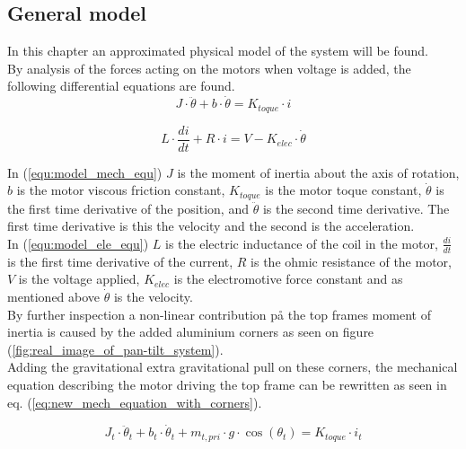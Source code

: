 \documentclass[../../main]{subfiles}
\begin{document}
\subsection{General model}
\label{sec:General_model}
In this chapter an approximated physical model of the system will be found.\\

By analysis of the forces acting on the motors when voltage is added, the following differential equations are found.\\

\begin{equation}
  \label{equ:model_mech_equ}
  J\cdot \ddot \theta + b\cdot \dot \theta = K_{toque}\cdot i
\end{equation}

\begin{equation}
  \label{equ:model_ele_equ}
  L\cdot \frac{di}{dt} + R\cdot i = V - K_{elec}\cdot \dot \theta
\end{equation}

In (\ref{equ:model_mech_equ}) $J$ is the moment of inertia about the axis of rotation, $b$ is the motor viscous friction constant, $K_{toque}$ is the motor toque constant, $\dot \theta$ is the first time derivative of the position, and $\ddot \theta$ is the second time derivative. The first time derivative is this the velocity and the second is the acceleration.\\
In (\ref{equ:model_ele_equ}) $L$ is the electric inductance of the coil in the motor, $\frac{di}{dt}$ is the first time derivative of the current, $R$ is the ohmic resistance of the motor, $V$ is the voltage applied, $K_{elec}$ is the electromotive force constant and as mentioned above $\dot \theta$ is the velocity.\\

By further inspection a non-linear contribution på the top frames moment of inertia is caused by the added aluminium corners as seen on figure (\ref{fig:real_image_of_pan-tilt_system}).\\
Adding the gravitational extra gravitational pull on these corners, the mechanical equation describing the motor driving the top frame can be rewritten as seen in eq. (\ref{eq:new_mech_equation_with_corners}).

\begin{equation}
  \label{eq:new_mech_equation_with_corners}
  J_t\cdot \ddot \theta_t + b_t\cdot \dot \theta_t + m_{t,pri}\cdot g \cdot \cos(\theta_t) = K_{toque}\cdot i_t
\end{equation}
\end{document}

